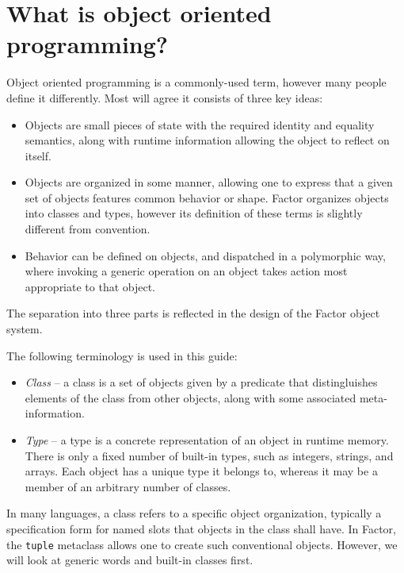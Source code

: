 \documentclass[english]{book}
\begin{document}
\section{What is object oriented programming?}

Object oriented programming is a commonly-used term, however many people
define it differently. Most will agree it consists of three key ideas:

\begin{itemize}
\item Objects are small pieces of state with the required identity and
equality semantics, along with runtime information
allowing the object to reflect on itself.

\item Objects are organized in some manner, allowing one to express
that a given set of objects features common behavior or shape. Factor organizes
objects into classes and types, however its definition of these terms is
slightly different from convention.

\item Behavior can be defined on objects, and dispatched in a polymorphic way,
where invoking a generic operation on an object takes action most
appropriate to that object.
\end{itemize}

The separation into three parts is reflected in the design of the Factor
object system.

The following terminology is used in this guide:

\begin{itemize}
\item \emph{Class} -- a class is a set of objects given by a predicate
that distingluishes elements of the class from other objects, along with
some associated meta-information.

\item \emph{Type} -- a type is a concrete representation of an object
in runtime memory. There is only a fixed number of built-in types, such as
integers, strings, and arrays. Each object has a unique type it belongs to,
whereas it may be a member of an arbitrary number of classes.

\end{itemize}

In many languages, a class refers to a specific object organization,
typically a specification form for named slots that objects in the class
shall have. In Factor, the \texttt{tuple} metaclass allows one to create
such conventional objects. However, we will look at generic words
and built-in classes first.
\end{document}
